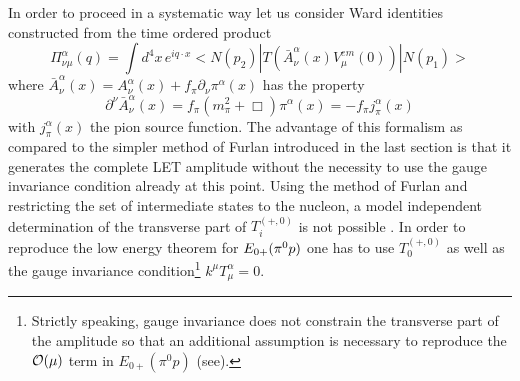 In order to proceed in a systematic way let us consider Ward identities
constructed from the time ordered product \cite{Rad,MMS}
\begin{equation}
\label{Pimunu}
\Pi^\alpha_{\nu\mu}(q) = \int d^4 x\, e^{iq\cdot x}<N(p_2)| T\left(
\bar{A}^\alpha_\nu (x) V_\mu^{em} (0) \right) |N(p_1)>
\end{equation}
where $\bar{A}_\nu^\alpha (x) = A_\nu^\alpha (x) + f_\pi \partial_\nu 
\pi^\alpha (x)$ has the  property 
\begin{equation}
\partial^\nu \bar{A}_\nu^\alpha (x) = f_\pi (m_\pi^2 + \Box )\pi^\alpha (x)
=- f_\pi j_\pi^\alpha (x)
\end{equation}
with $j_\pi^\alpha (x)$  the pion source function. The advantage of this
formalism  as compared to the simpler method of Furlan introduced in the last
section is that it generates the complete LET amplitude without the 
necessity to use the gauge invariance condition already at this point.
Using the method of Furlan and restricting the set of intermediate states 
to the nucleon, a  model independent determination of the transverse part
of $T_i^{(+,0)}$ is not  possible \cite{FPV}. In order to reproduce the
low energy theorem for $E_{0+}(\pi^0 p)$ one has to use $T_0^{(+,0)}$ as well as the 
gauge invariance condition\footnote{Strictly speaking,  gauge invariance
does not constrain the transverse part of the amplitude so that
an additional assumption is necessary to reproduce the ${\cal O}(\mu)$
term in $E_{0+}(\pi^0 p)$ (see\cite{FPV}).} 
 $k^\mu T^\alpha_\mu =0$. 

